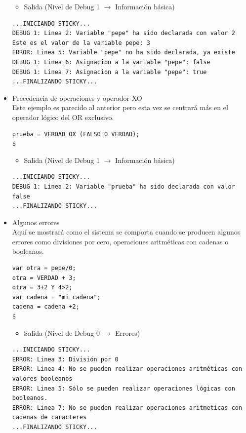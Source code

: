 \documentclass[a4paper, 12pt]{book}
\begin{document}
\begin{itemize}
  \begin{itemize}
  \item Salida (Nivel de Debug 1 $\rightarrow$ Información básica)
  \end{itemize}
\begin{verbatim}
...INICIANDO STICKY...
DEBUG 1: Linea 2: Variable "pepe" ha sido declarada con valor 2
Este es el valor de la variable pepe: 3
ERROR: Linea 5: Variable "pepe" no ha sido declarada, ya existe
DEBUG 1: Linea 6: Asignacion a la variable "pepe": false
DEBUG 1: Linea 7: Asignacion a la variable "pepe": true
...FINALIZANDO STICKY...
\end{verbatim}
  
  
  
  
\item Precedencia de operaciones y operador XO\\
  
  
  Este ejemplo es parecido al anterior pero esta vez se centrará más en el operador lógico del OR exclusivo.
  
  
\begin{verbatim}
prueba = VERDAD OX (FALSO O VERDAD);
$
\end{verbatim}

  
  \begin{itemize}
  \item Salida (Nivel de Debug 1 $\rightarrow$ Información básica)
  \end{itemize}
\begin{verbatim}
...INICIANDO STICKY...
DEBUG 1: Linea 2: Variable "prueba" ha sido declarada con valor false
...FINALIZANDO STICKY...
\end{verbatim}
  
  
  
  
\item Algunos errores\\
  

  Aquí se mostrará como el sistema se comporta cuando se producen algunos errores como divisiones por cero, operaciones aritméticas con cadenas o booleanos. \\
  
  
\begin{verbatim}
var otra = pepe/0;
otra = VERDAD + 3;
otra = 3+2 Y 4>2;
var cadena = "mi cadena";
cadena = cadena +2;
$
\end{verbatim}
  
  
  
  \begin{itemize}
  \item Salida (Nivel de Debug 0 $\rightarrow$ Errores)
\end{itemize}
\begin{verbatim}
...INICIANDO STICKY...
ERROR: Linea 3: División por 0
ERROR: Linea 4: No se pueden realizar operaciones aritméticas con valores booleanos
ERROR: Linea 5: Sólo se pueden realizar operaciones lógicas con booleanos.
ERROR: Linea 7: No se pueden realizar operaciones aritmeticas con cadenas de caracteres
...FINALIZANDO STICKY...
\end{verbatim}





\end{itemize}
\end{document}
